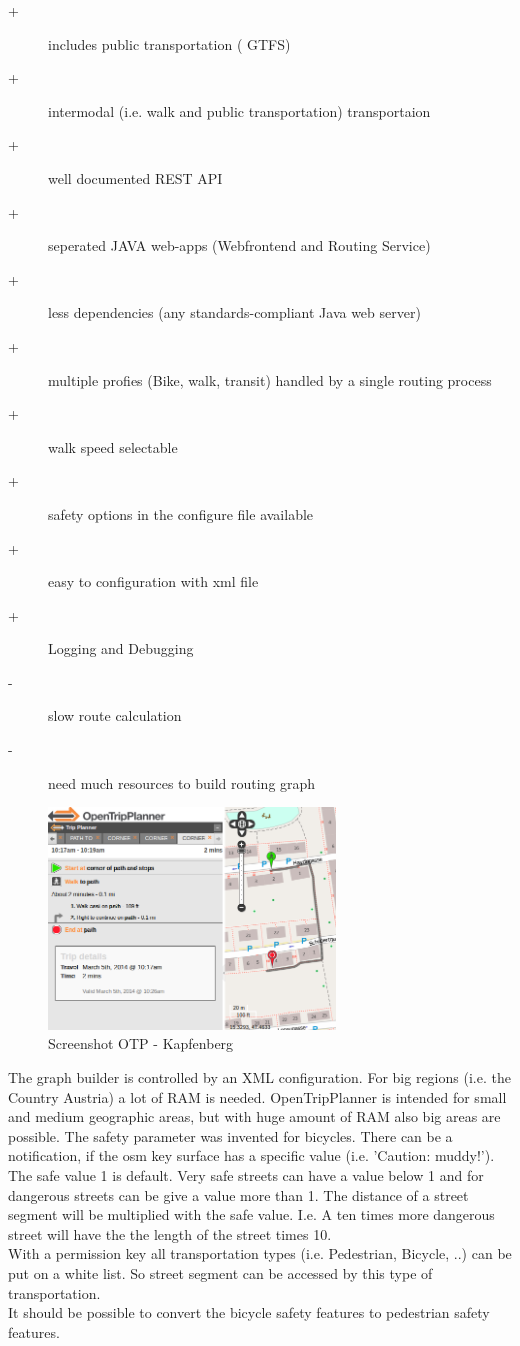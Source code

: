 \documentclass{sig-alternate}
\begin{document}
\begin{description}
  \item[+] includes public transportation ( GTFS)
  \item[+] intermodal (i.e. walk and public transportation) transportaion
  \item[+] well documented REST API
  \item[+] seperated JAVA web-apps (Webfrontend and Routing Service)
  \item[+] less dependencies (any standards-compliant Java web server)
  \item[+] multiple profies (Bike, walk, transit) handled by a single routing process
  \item[+] walk speed selectable
  \item[+] safety options in the configure file available
  \item[+] easy to configuration with xml file
  \item[+] Logging and Debugging 
  \item[-] slow route calculation
  \item[-] need much resources to build routing graph   
\end{description} 
 
\begin{figure}
\centering
\includegraphics[width=3in]{otp-ss.png}
\caption{Screenshot OTP - Kapfenberg}
\end{figure}
 
 The graph builder is controlled by an XML configuration. For big regions (i.e. the Country Austria) a lot of RAM is needed. OpenTripPlanner is intended for small and medium geographic areas, but with huge amount of RAM also big areas are possible. The safety parameter was invented for bicycles. There can be a notification, if the osm key surface  has a specific value (i.e. 'Caution: muddy!'). The safe value 1 is default. Very safe streets can have a value below 1 and for dangerous streets can be give a value more than 1. The distance of a street segment will be multiplied with the safe value. I.e. A ten times more dangerous street will have the the length of the street times 10. \\
 With a permission key all transportation types (i.e. Pedestrian, Bicycle, ..) can be put on a white list. So street segment can be accessed by this type of transportation. \\
 It should be possible to convert the bicycle safety features to pedestrian safety features.
 
\end{document}
